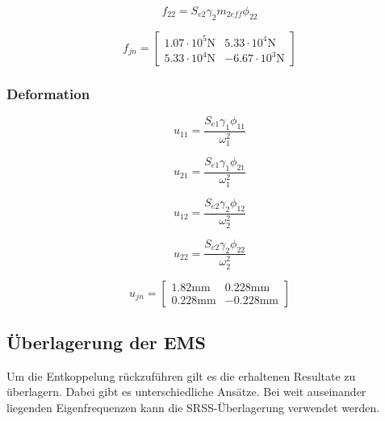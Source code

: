 \documentclass[
  letterpaper,
  DIV=11]{scrreprt}
\begin{document}
\begin{equation*}f_{22} = S_{e 2} \gamma_{2} m_{2 eff} \phi_{22}\end{equation*}

\begin{equation*}f_{jn} = \left[\begin{matrix}1.07 \cdot 10^{5} \text{N} & 5.33 \cdot 10^{4} \text{N}\\5.33 \cdot 10^{4} \text{N} & - 6.67 \cdot 10^{3} \text{N}\end{matrix}\right]\end{equation*}

\hypertarget{deformation}{%
\subsubsection{Deformation}\label{deformation}}

\begin{equation*}u_{11} = \frac{S_{e 1} \gamma_{1} \phi_{11}}{\omega_{1}^{2}}\end{equation*}

\begin{equation*}u_{21} = \frac{S_{e 1} \gamma_{1} \phi_{21}}{\omega_{1}^{2}}\end{equation*}

\begin{equation*}u_{12} = \frac{S_{e 2} \gamma_{2} \phi_{12}}{\omega_{2}^{2}}\end{equation*}

\begin{equation*}u_{22} = \frac{S_{e 2} \gamma_{2} \phi_{22}}{\omega_{2}^{2}}\end{equation*}

\begin{equation*}u_{jn} = \left[\begin{matrix}1.82 \text{mm} & 0.228 \text{mm}\\0.228 \text{mm} & - 0.228 \text{mm}\end{matrix}\right]\end{equation*}

\hypertarget{uxfcberlagerung-der-ems}{%
\subsection{Überlagerung der EMS}\label{uxfcberlagerung-der-ems}}

Um die Entkoppelung rückzuführen gilt es die erhaltenen Resultate zu
überlagern. Dabei gibt es unterschiedliche Ansätze. Bei weit auseinander
liegenden Eigenfrequenzen kann die SRSS-Überlagerung verwendet werden.
\end{document}
